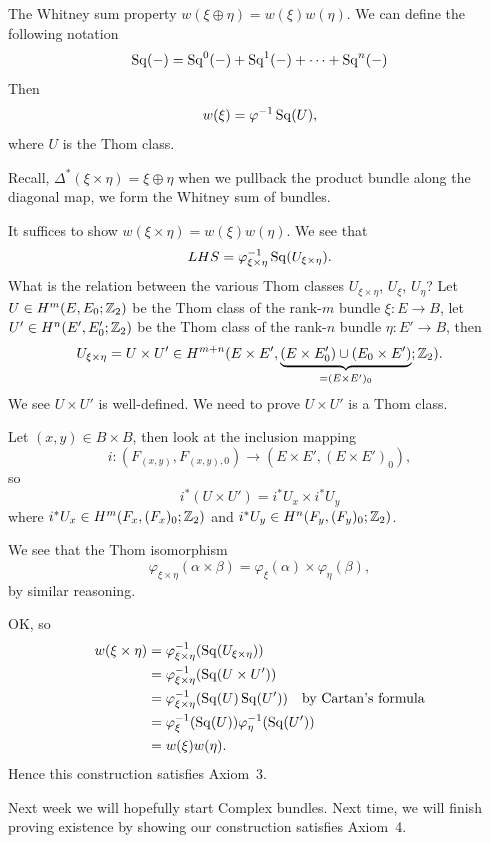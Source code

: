 \begin{Proof}
The Whitney sum property $w(\xi\oplus\eta)=w(\xi)w(\eta)$.
We can define the following notation
\begin{equation}
\operatorname{Sq}(-)=\operatorname{Sq}^{0}(-)+\operatorname{Sq}^{1}(-)+\dots+\operatorname{Sq}^{n}(-)
\end{equation}
Then
\begin{equation}
w(\xi)=\varphi^{-1}\operatorname{Sq}(U),
\end{equation}
where $U$ is the Thom class.

Recall, $\Delta^{*}(\xi\times\eta)=\xi\oplus\eta$ when we pullback the
product bundle along the diagonal map, we form the Whitney sum of bundles.

It suffices to show $w(\xi\times\eta)=w(\xi)w(\eta)$.
We see that
\begin{equation}
LHS = \varphi_{\xi\times\eta}^{-1}\operatorname{Sq}(U_{\xi\times\eta}).
\end{equation}
What is the relation between the various Thom classes
$U_{\xi\times\eta}$, $U_{\xi}$, $U_{\eta}$? Let $U\in H^{m}(E,E_{0};\mathbb{Z}_{2})$
be the Thom class of the rank-$m$ bundle $\xi\colon E\to B$, let
$U'\in H^{n}(E',E'_{0};\mathbb{Z}_{2})$ be the Thom class of the rank-$n$
bundle $\eta\colon E'\to B$, then
\begin{equation}
U_{\xi\times\eta}=U\times U'\in H^{m+n}(E\times E',\underbrace{(E\times
E_{0}')\cup(E_{0}\times E')}_{=(E\times E')_{0}};\mathbb{Z}_{2}).
\end{equation}
We see $U\times U'$ is well-defined. We need to prove $U\times U'$ is
a Thom class.

Let $(x,y)\in B\times B$, then look at the inclusion mapping
\begin{equation}
i\colon(F_{(x,y)},F_{(x,y),0})\to(E\times E',(E\times E')_{0}),
\end{equation}
so
\begin{equation}
i^{*}(U\times U') = i^{*}U_{x}\times i^{*}U_{y}
\end{equation}
where $i^{*}U_{x}\in H^{m}(F_{x},(F_{x})_{0};\mathbb{Z}_{2})$ and
$i^{*}U_{y}\in H^{n}(F_{y},(F_{y})_{0};\mathbb{Z}_{2})$.

We see that the Thom isomorphism
\begin{equation}
\varphi_{\xi\times\eta}(\alpha\times\beta)=\varphi_{\xi}(\alpha)\times\varphi_{\eta}(\beta),
\end{equation}
by similar reasoning.

OK, so
\begin{subequations}
  \begin{align}
w(\xi\times\eta)
&=\varphi_{\xi\times\eta}^{-1}(\operatorname{Sq}(U_{\xi\times\eta}))\\
&=\varphi_{\xi\times\eta}^{-1}(\operatorname{Sq}(U\times U'))\\
&=\varphi_{\xi\times\eta}^{-1}(\operatorname{Sq}(U)\operatorname{Sq}(U'))\quad\mbox{by Cartan's formula}\\
&=\varphi_{\xi}^{-1}(\operatorname{Sq}(U))\varphi_{\eta}^{-1}(\operatorname{Sq}(U'))\\
&=w(\xi)w(\eta).
  \end{align}
\end{subequations}
Hence this construction satisfies Axiom~3.
\end{Proof}

Next week we will hopefully start Complex bundles. Next time, we will
finish proving existence by showing our construction satisfies Axiom~4.